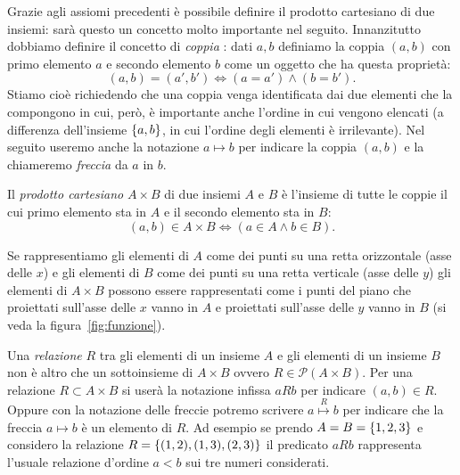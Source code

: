 Grazie agli assiomi precedenti è possibile definire il prodotto cartesiano
di due insiemi: sarà questo un concetto molto importante nel seguito.
Innanzitutto dobbiamo definire il concetto di \emph{coppia}%
%
: dati
$a,b$ definiamo la coppia $(a,b)$ con primo elemento $a$ e secondo elemento $b$
come un oggetto che ha questa proprietà:%
%
\begin{equation}\label{eq:coppia}
  (a, b) = (a', b') \iff (a=a') \land (b=b').
\end{equation}
Stiamo cioè richiedendo che una coppia venga identificata dai due
elementi che la compongono in cui, però, è importante anche l'ordine in
cui vengono elencati (a differenza dell'insieme ${\left\{ a,b \right\}}$, in cui
l'ordine degli elementi è irrilevante).
Nel seguito useremo anche la notazione $a \mapsto b$ per indicare 
la coppia $(a,b)$ e la chiameremo \emph{freccia}%
%
 da $a$ in $b$.

Il \emph{prodotto cartesiano} $A\times B$ di due insiemi $A$ e $B$
è l'insieme di tutte le coppie
il cui primo elemento sta in $A$ e
il secondo elemento sta in $B$:
\[
  (a, b) \in A \times B \iff (a\in A \land b\in B).
\]

Se rappresentiamo gli elementi di $A$ come dei punti su una retta
orizzontale (asse delle $x$) e gli elementi di $B$ come dei punti
su una retta verticale (asse delle $y$) gli elementi di $A\times B$
possono essere rappresentati come i punti del piano che proiettati sull'asse
delle $x$ vanno in $A$ e proiettati sull'asse delle $y$ vanno in $B$
(si veda la figura~\ref{fig:funzione}). 
  
Una \emph{relazione}%
%
 $R$ tra gli elementi di un insieme $A$ e gli elementi
di un insieme $B$ non è altro che un sottoinsieme di $A\times B$
ovvero $R\in \mathcal P(A\times B)$.
Per una relazione $R\subset A\times B$ si userà la notazione infissa
$aRb$ per indicare $(a,b)\in R$.
Oppure con la notazione delle freccie potremo 
scrivere $a \stackrel R \mapsto b$
per indicare che la freccia $a\mapsto b$ è un elemento di $R$. 
Ad esempio se prendo $A=B={\left\{ 1,2,3 \right\}}$ e considero la relazione 
$R={\left\{ (1,2),(1,3),(2,3) \right\}}$
il predicato $aRb$ rappresenta l'usuale relazione d'ordine $a<b$ sui
tre numeri considerati.

